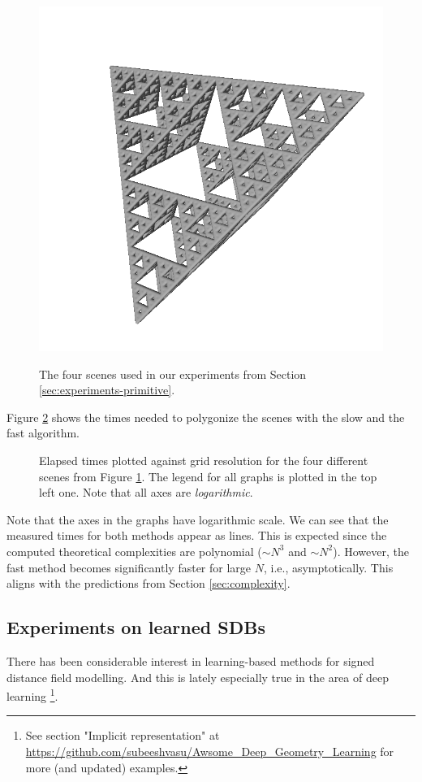 \documentclass[11pt,twocolumn]{article}
\begin{document}
\begin{figure}
{				\includegraphics{sierp.png}
			}
			\caption
			{
				The four scenes used in our experiments from Section \ref{sec:experiments-primitive}.
			}
			\label{fig:primitive-scenes}
		\end{figure}

		Figure \ref{fig:times} shows the times needed to polygonize the scenes with the slow and the fast algorithm.
		\begin{figure}[ht]
			\centering
			
			\caption
			{
				Elapsed times plotted against grid resolution for the four different scenes from Figure \ref{fig:primitive-scenes}.
				The legend for all graphs is plotted in the top left one.
				Note that all axes are \textit{logarithmic}.
			}
			\label{fig:times}
		\end{figure}
		Note that the axes in the graphs have logarithmic scale.
		We can see that the measured times for both methods appear as lines.
		This is expected since the computed theoretical complexities are polynomial ($\sim N^3$ and $\sim N^2$).
		However, the fast method becomes significantly faster for large $N$, i.e., asymptotically.
		This aligns with the predictions from Section \ref{sec:complexity}.

		\subsection{Experiments on learned SDBs}\label{sec:experiments-learned}
		There has been considerable interest in learning-based methods for signed distance field modelling.
		And this is lately especially true in the area of deep learning
		\cite{GenShapeCVPR2019,DeepShapeCVPR2019,davies2020overfit,hao2020dualsdf,SecretsOfWildSDFs2021,iccvw2021,stanfordgeom2021,asdf2021,takikawa2021nglod}\footnote{See section "Implicit representation" at \url{https://github.com/subeeshvasu/Awsome_Deep_Geometry_Learning} for more (and updated) examples.}.
\end{document}
